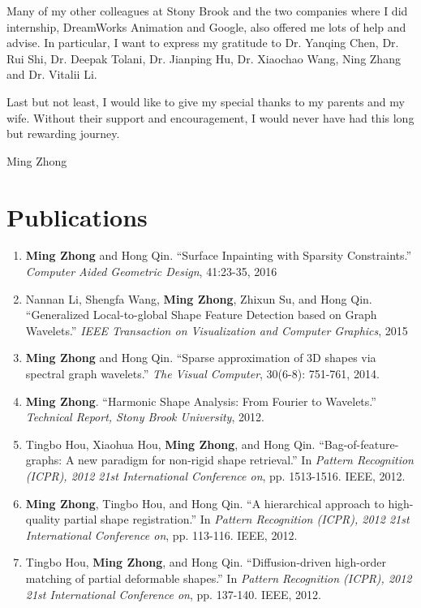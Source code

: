 \documentclass[12pt,letterpaper,twosided]{report}
\numberwithin{equation}{section}
\begin{document}
Many of my other colleagues at Stony Brook and the two companies where I did internship,
DreamWorks Animation and Google, also offered me lots of help and advise.
In particular, I want to express my gratitude to Dr. Yanqing Chen, Dr. Rui Shi,
Dr. Deepak Tolani, Dr. Jianping Hu, Dr. Xiaochao Wang, Ning Zhang and Dr. Vitalii Li.

Last but not least, I would like to give my special thanks to my parents and
my wife. Without their support and encouragement, I would never have had this long
but rewarding journey.
\\
\begin{flushright}
Ming Zhong\hspace*{0.25in}
\end{flushright}


\newpage
\chapter*{Publications}

\begin{enumerate}
\item \textbf{Ming Zhong} and Hong Qin. ``Surface Inpainting with Sparsity Constraints.'' \emph{Computer Aided Geometric Design}, 41:23-35, 2016
\item Nannan Li, Shengfa Wang, \textbf{Ming Zhong}, Zhixun Su, and Hong Qin. ``Generalized Local-to-global Shape Feature Detection based on Graph Wavelets.'' \emph{IEEE Transaction on Visualization and Computer Graphics}, 2015
\item \textbf{Ming Zhong} and Hong Qin. ``Sparse approximation of 3D shapes via spectral graph wavelets.'' \emph{The Visual Computer}, 30(6-8): 751-761, 2014.
\item \textbf{Ming Zhong}. ``Harmonic Shape Analysis: From Fourier to Wavelets.'' \emph{Technical Report, Stony Brook University}, 2012.
\item Tingbo Hou, Xiaohua Hou, \textbf{Ming Zhong}, and Hong Qin. ``Bag-of-feature-graphs: A new paradigm for non-rigid shape retrieval.'' In \emph{Pattern Recognition (ICPR), 2012 21st International Conference on}, pp. 1513-1516. IEEE, 2012.
\item \textbf{Ming Zhong}, Tingbo Hou, and Hong Qin. ``A hierarchical approach to high-quality partial shape registration.'' In \emph{Pattern Recognition (ICPR), 2012 21st International Conference on}, pp. 113-116. IEEE, 2012.
\item Tingbo Hou, \textbf{Ming Zhong}, and Hong Qin. ``Diffusion-driven high-order matching of partial deformable shapes.'' In \emph{Pattern Recognition (ICPR), 2012 21st International Conference on}, pp. 137-140. IEEE, 2012.
\end{enumerate}
\end{document}
